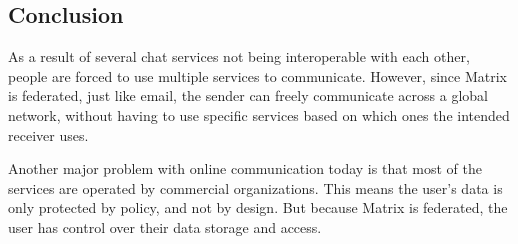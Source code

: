 \subsection{Conclusion}

As a result of several chat services not being interoperable with each other, people are 
forced to use multiple services to communicate.
However, since Matrix is federated, just like email, the sender can freely communicate across a 
global network, without having to use specific services based on which ones the intended receiver uses.

Another major problem with online communication today is that most of the services are operated by commercial organizations. This means the user's data is only protected by policy, and not by design.
But because Matrix is federated, the user has control over their data storage and access.~\cite{RumaWhyMatrix}

